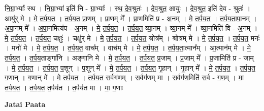 \documentclass[17pt]{extarticle}
\begin{document}
नि॒ग्रा॒भ्याः᳚ स्थ । नि॒ग्रा॒भ्या॑ इति॑ नि - ग्रा॒भ्याः᳚ । स्थ॒ दे॒व॒श्रुतः॑ । दे॒व॒श्रुत॒ आयुः॑ । दे॒व॒श्रुत॒ इति॑ देव - श्रुतः॑ । आयु॑र् मे । मे॒ त॒र्प॒य॒त॒ । त॒र्प॒य॒त॒ प्रा॒णम् । प्रा॒णम् मे᳚ । प्रा॒णमिति॑ प्र - अ॒नम् । मे॒ त॒र्प॒य॒त॒ । त॒र्प॒य॒ता॒पा॒नम् । अ॒पा॒नम् मे᳚ । अ॒पा॒नमित्य॑प - अ॒नम् । मे॒ त॒र्प॒य॒त॒ । त॒र्प॒य॒त॒ व्या॒नम् । व्या॒नम् मे᳚ । व्या॒नमिति॑ वि - अ॒नम् । मे॒ त॒र्प॒य॒त॒ । त॒र्प॒य॒त॒ चक्षुः॑ । चक्षु॑र् मे । मे॒ त॒र्प॒य॒त॒ । त॒र्प॒य॒त॒ श्रोत्र᳚म् । श्रोत्र॑म् मे । मे॒ त॒र्प॒य॒त॒ । त॒र्प॒य॒त॒ मनः॑ । मनो॑ मे । मे॒ त॒र्प॒य॒त॒ । त॒र्प॒य॒त॒ वाच᳚म् । वाच॑म् मे । मे॒ त॒र्प॒य॒त॒ । त॒र्प॒य॒ता॒त्मान᳚म् । आ॒त्मान॑म् मे । मे॒ त॒र्प॒य॒त॒ । त॒र्प॒य॒ताङ्गा॑नि । अङ्गा॑नि मे । मे॒ त॒र्प॒य॒त॒ । त॒र्प॒य॒त॒ प्र॒जाम् । प्र॒जाम् मे᳚ । प्र॒जामिति॑ प्र - जाम् । मे॒ त॒र्प॒य॒त॒ । त॒र्प॒य॒त॒ प॒शून् । प॒शून् मे᳚ । मे॒ त॒र्प॒य॒त॒ । त॒र्प॒य॒त॒ गृ॒हान् । गृ॒हान् मे᳚ । मे॒ त॒र्प॒य॒त॒ । त॒र्प॒य॒त॒ ग॒णान् । ग॒णान् मे᳚ । मे॒ त॒र्प॒य॒त॒ । त॒र्प॒य॒त॒ स॒र्वग॑णम् । स॒र्वग॑णम् मा । स॒र्वग॑ण॒मिति॑ स॒र्व - ग॒ण॒म् । मा॒ त॒र्प॒य॒त॒ । त॒र्प॒य॒त॒ त॒र्पय॑त । त॒र्पय॑त मा । मा॒ ग॒णाः \newline

\textbf{Jatai Paata} \newline
\end{document}
